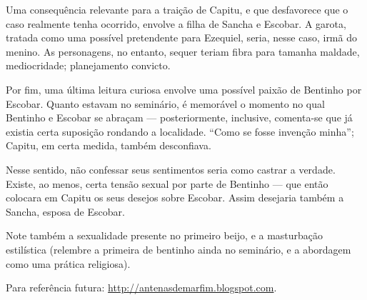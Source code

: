 Uma consequência relevante para a traição de Capitu, e que desfavorece que o caso realmente tenha ocorrido, envolve a filha de Sancha e Escobar. A garota, tratada como uma possível pretendente para Ezequiel, seria, nesse caso, irmã do menino. As personagens, no entanto, sequer teriam fibra para tamanha maldade, mediocridade; planejamento convicto.

Por fim, uma última leitura curiosa envolve uma possível paixão de Bentinho por Escobar. Quanto estavam no seminário, é memorável o momento no qual Bentinho e Escobar se abraçam — posteriormente, inclusive, comenta-se que já existia certa suposição rondando a localidade. ``Como se fosse invenção minha''; Capitu, em certa medida, também desconfiava.

Nesse sentido, não confessar seus sentimentos seria como castrar a verdade. Existe, ao menos, certa tensão sexual por parte de Bentinho — que então colocara em Capitu os seus desejos sobre Escobar. Assim desejaria também a Sancha, esposa de Escobar.

Note também a sexualidade presente no primeiro beijo, e a masturbação estilística (relembre a primeira de bentinho ainda no seminário, e a abordagem como uma prática religiosa).

Para referência futura: \url{http://antenasdemarfim.blogspot.com}.